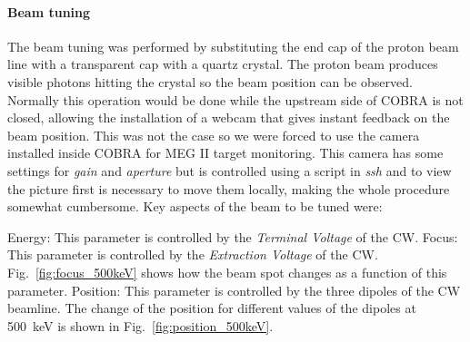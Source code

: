 \begin{refsection}
    \paragraph{Beam tuning}
        The beam tuning was performed by substituting the end cap of the proton beam line with a transparent cap with a quartz crystal. 
        The proton beam produces visible photons hitting the crystal so the beam position can be observed.
        Normally this operation would be done while the upstream side of COBRA is not closed, allowing the installation of a webcam that gives instant feedback on the beam position.
        This was not the case so we were forced to use the camera installed inside COBRA for MEG II target monitoring.
        This camera has some settings for \textit{gain} and \textit{aperture} but is controlled using a script in \textit{ssh} and to view the picture first is necessary to move them locally, making the whole procedure somewhat cumbersome.
        Key aspects of the beam to be tuned were: 
        \begin{outline}
            \1 Energy: This parameter is controlled by the \textit{Terminal Voltage} of the CW.
            \1 Focus: This parameter is controlled by the \textit{Extraction Voltage} of the CW. Fig.~\ref{fig:focus_500keV} shows how the beam spot changes as a function of this parameter. 
            \1 Position: This parameter is controlled by the three dipoles of the CW beamline. The change of the position for different values of the dipoles at \SI{500}{keV} is shown in Fig.~\ref{fig:position_500keV}.
        \end{outline}


\end{refsection}

